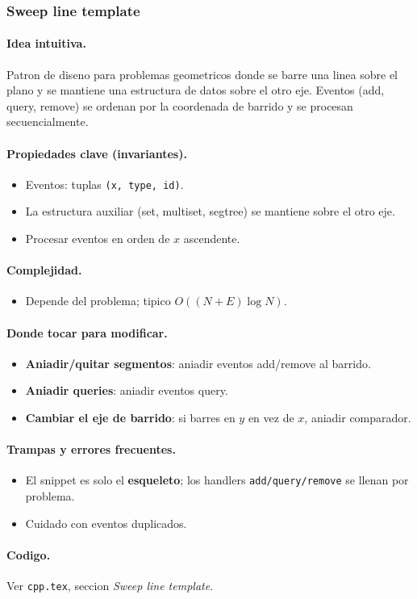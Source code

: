 ﻿\subsubsection{Sweep line template}

\paragraph{Idea intuitiva.}
Patron de diseno para problemas geometricos donde se barre una linea sobre el plano y se mantiene una estructura de datos sobre el otro eje. Eventos (add, query, remove) se ordenan por la coordenada de barrido y se procesan secuencialmente.

\paragraph{Propiedades clave (invariantes).}
\begin{itemize}\setlength\itemsep{0pt}
	\item Eventos: tuplas \texttt{(x, type, id)}.
	\item La estructura auxiliar (set, multiset, segtree) se mantiene sobre el otro eje.
	\item Procesar eventos en orden de $x$ ascendente.
\end{itemize}

\paragraph{Complejidad.}
\begin{itemize}\setlength\itemsep{0pt}
	\item Depende del problema; tipico $O((N + E) \log N)$.
\end{itemize}

\paragraph{Donde tocar para modificar.}
\begin{itemize}\setlength\itemsep{0pt}
	\item \textbf{Aniadir/quitar segmentos}: aniadir eventos add/remove al barrido.
	\item \textbf{Aniadir queries}: aniadir eventos query.
	\item \textbf{Cambiar el eje de barrido}: si barres en $y$ en vez de $x$, aniadir comparador.
\end{itemize}

\paragraph{Trampas y errores frecuentes.}
\begin{itemize}\setlength\itemsep{0pt}
	\item El snippet es solo el \textbf{esqueleto}; los handlers \texttt{add/query/remove} se llenan por problema.
	\item Cuidado con eventos duplicados.
\end{itemize}

\paragraph{Codigo.}
Ver \texttt{cpp.tex}, seccion \textit{Sweep line template}.

\vspace{0.5em}
